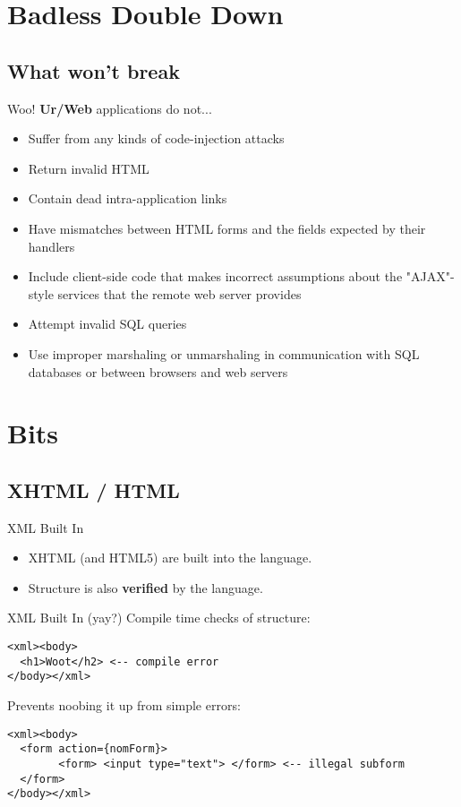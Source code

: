 \documentclass[aspectratio=169]{beamer}
\begin{document}
\section{Badless Double Down}
\subsection{What won't break}
\begin{frame}{Woo!}
\textbf{Ur/Web} applications do not...

\begin{itemize}
\item Suffer from any kinds of code-injection attacks
\item Return invalid HTML
\item Contain dead intra-application links
\item Have mismatches between HTML forms and the fields expected by their handlers
\item Include client-side code that makes incorrect assumptions about the "AJAX"-style services that the remote web server provides
\item Attempt invalid SQL queries
\item Use improper marshaling or unmarshaling in communication with SQL databases or between browsers and web servers
\end{itemize}
\end{frame}

\section{Bits}
\subsection{XHTML / HTML}
\begin{frame}{XML Built In}

\begin{itemize}
\item XHTML (and HTML5) are built into the language.\\
\item Structure is also \textbf{verified} by the language.
\end{itemize}
\end{frame}

\begin{frame}[fragile]{XML Built In (yay?)}
Compile time checks of structure:
\begin{verbatim}
<xml><body>
  <h1>Woot</h2> <-- compile error
</body></xml>
\end{verbatim}
Prevents noobing it up from simple errors:
\begin{verbatim}
<xml><body>
  <form action={nomForm}>
		<form> <input type="text"> </form> <-- illegal subform
  </form>
</body></xml>
\end{verbatim}
\end{frame}
\end{document}
